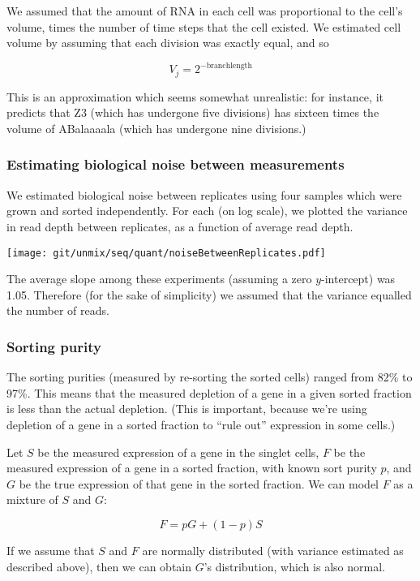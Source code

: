 \documentclass{article}
\begin{document}
We assumed that the amount of RNA in each cell was proportional to the cell's volume,
times the number of time steps that the cell existed.
We estimated cell volume by assuming that each division was exactly equal, and so

\[
V_j = 2^{-\mathrm{branchlength}}
\]

This is an approximation which seems somewhat unrealistic: for instance, it predicts
that Z3 (which has undergone five divisions) has sixteen times the volume of 
ABalaaaala (which has undergone nine divisions.)

\subsubsection*{Estimating biological noise between measurements}

We estimated biological noise between replicates using four samples which were
grown and sorted independently. For each (on log scale), we plotted the variance
in read depth between replicates, as a function of average read depth.

\texttt{[image: git/unmix/seq/quant/noiseBetweenReplicates.pdf]}

The average slope among these experiments (assuming a zero $y$-intercept) was 1.05.
Therefore (for the sake of simplicity)
we assumed that the variance equalled the number of reads.

\subsubsection*{Sorting purity}

The sorting purities (measured by re-sorting the sorted cells) ranged from 82\% to 97\%.
This means that the measured depletion of a gene in a given sorted fraction is less than
the actual depletion. (This is important, because we're using depletion of a gene in a
sorted fraction to ``rule out'' expression in some cells.)

Let $S$ be the measured expression of a gene in the singlet cells,
$F$ be the
measured expression of a gene in a sorted fraction, with known sort purity $p$, and
$G$ be the true expression of that gene in the sorted fraction.
We can model $F$ as a mixture of $S$ and $G$:

\[
F = pG + (1-p)S
\]

If we assume that $S$ and $F$ are normally distributed (with variance estimated as described
above), then we can obtain $G$'s distribution, which is also normal.
\end{document}
